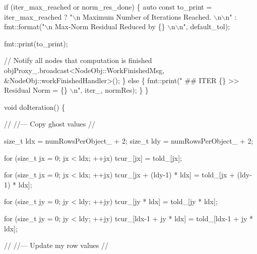 \begin{DoxyCodeInclude}
    \textcolor{keywordflow}{if} (iter\_max\_reached or norm\_res\_done) \{
      \textcolor{keyword}{auto} \textcolor{keyword}{const} to\_print = iter\_max\_reached ?
        \textcolor{stringliteral}{"\(\backslash\)n Maximum Number of Iterations Reached. \(\backslash\)n\(\backslash\)n"} :
        fmt::format(\textcolor{stringliteral}{"\(\backslash\)n Max-Norm Residual Reduced by \{\} \(\backslash\)n\(\backslash\)n"}, default\_tol);

      fmt::print(to\_print);

      \textcolor{comment}{// Notify all nodes that computation is finished}
      objProxy\_.broadcast<NodeObj::WorkFinishedMsg, &NodeObj::workFinishedHandler>();
    \} \textcolor{keywordflow}{else} \{
      fmt::print(\textcolor{stringliteral}{" ## ITER \{\} >> Residual Norm = \{\} \(\backslash\)n"}, iter\_, normRes);
    \}
  \}

  \textcolor{keywordtype}{void} doIteration() \{

    \textcolor{comment}{//}
    \textcolor{comment}{//--- Copy ghost values}
    \textcolor{comment}{//}

    \textcolor{keywordtype}{size\_t} ldx = numRowsPerObject\_ + 2;
    \textcolor{keywordtype}{size\_t} ldy = numRowsPerObject\_ + 2;

    \textcolor{keywordflow}{for} (\textcolor{keywordtype}{size\_t} jx = 0; jx < ldx; ++jx)
      tcur\_[jx] = told\_[jx];

    \textcolor{keywordflow}{for} (\textcolor{keywordtype}{size\_t} jx = 0; jx < ldx; ++jx)
      tcur\_[jx + (ldy-1) * ldx] = told\_[jx + (ldy-1) * ldx];

    \textcolor{keywordflow}{for} (\textcolor{keywordtype}{size\_t} jy = 0; jy < ldy; ++jy)
      tcur\_[jy * ldx] = told\_[jy * ldx];

    \textcolor{keywordflow}{for} (\textcolor{keywordtype}{size\_t} jy = 0; jy < ldy; ++jy)
      tcur\_[ldx-1 + jy * ldx] = told\_[ldx-1 + jy * ldx];

    \textcolor{comment}{//}
    \textcolor{comment}{//--- Update my row values}
    \textcolor{comment}{//}


\end{DoxyCodeInclude}
